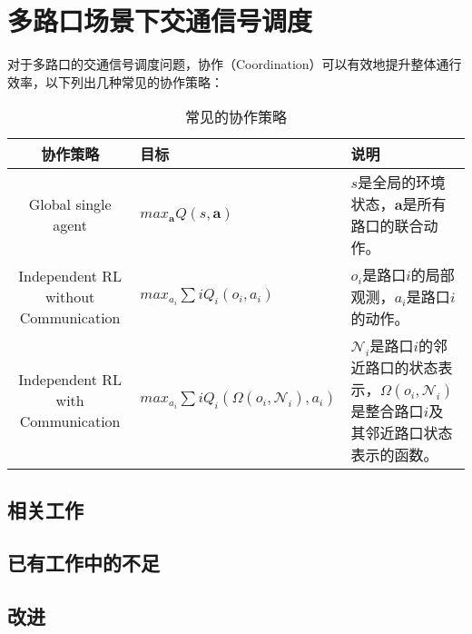 
\chapter{多路口场景下交通信号调度}
对于多路口的交通信号调度问题，协作（Coordination）可以有效地提升整体通行效率，以下列出几种常见的协作策略：
\begin{table}[htb]
    \caption[协作策略]{常见的协作策略\label{tab:coordination}}
    \begin{tabular}{clp{}}
      \toprule
      协作策略 & 目标 & 说明 \\
      \midrule
      Global single agent & $max_{\mathbf{a}}Q(s, \mathbf{a})$ & $s$是全局的环境状态，$\mathbf{a}$是所有路口的联合动作。\\
      Independent RL without Communication & $max_{a_{i}}\sum{i}Q_{i}(o_i, a_i)$ & $o_i$是路口$i$的局部观测，$a_i$是路口$i$的动作。\\
      Independent RL with Communication & $max_{a_i}\sum{i}Q_i(\Omega(o_i, \mathcal{N}_i), a_i)$ &$\mathcal{N}_i$是路口$i$的邻近路口的状态表示，$\Omega(o_i, \mathcal{N}_i)$是整合路口$i$及其邻近路口状态表示的函数。\\
      \bottomrule
    \end{tabular}
\end{table}

\section{相关工作}

\section{已有工作中的不足}

\section{改进}

